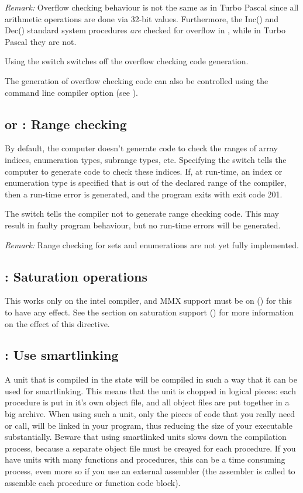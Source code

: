 \documentclass{report}
\begin{document}
\emph{ Remark: } Overflow checking behaviour is not the same as in
Turbo Pascal since all arithmetic operations are done via 32-bit
values. Furthermore, the Inc() and Dec() standard system procedures
\emph{ are } checked for overflow in \fpc, while in Turbo Pascal they
are not.

Using the  switch switches off the overflow checking code
generation.

The generation of overflow checking code can also be controlled
using the  command line compiler option (see \userref).

\subsection{ or  : Range checking}
By default, the computer doesn't generate code to check the ranges of array
indices, enumeration types, subrange types, etc. Specifying the
 switch tells the computer to generate code to check these
indices. If, at run-time, an index or enumeration type is specified that is
out of the declared range of the compiler, then a run-time error is
generated, and the program exits with exit code 201.

The  switch tells the compiler not to generate range checking
code. This may result in faulty program behaviour, but no run-time errors
will be generated.

{\em Remark: } Range checking for sets and enumerations are not yet fully
implemented.

\subsection{ : Saturation operations}
This works only on the intel compiler, and MMX support must be on
() for this to have any effect. See the section on
saturation support () for more information
on the effect of this directive.

\subsection{ : Use smartlinking}

A unit that is compiled in the  state will be
compiled in such a way that it can be used for smartlinking. This means that
the unit is chopped in logical pieces: each procedure is put in it's own 
object file, and all object files are put together in a big archive. When
using such a unit, only the pieces of code that you really need or call, 
will be linked in your program, thus reducing the size of your executable
substantially. Beware that using smartlinked units slows down the
compilation process, because a separate object file must be creayed for each
procedure. If you have units with many functions and procedures, this can 
be a time consuming process, even more so if you use an external assembler
(the assembler is called to assemble each procedure or function code block).
\end{document}
